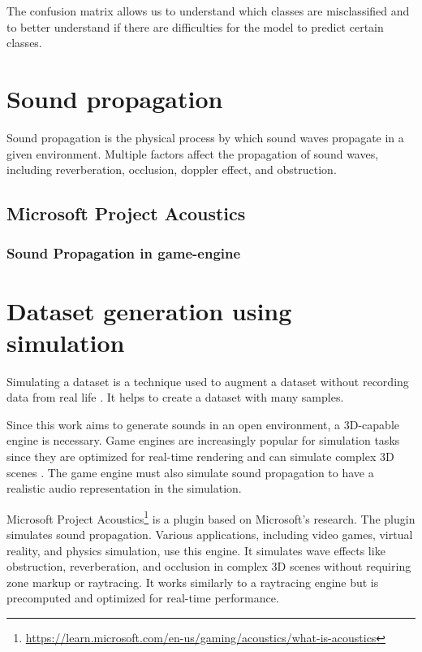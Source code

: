 The confusion matrix allows us to understand which classes are misclassified and to better understand if there are difficulties for the model to predict certain classes.


\section{Sound propagation}
Sound propagation is the physical process by which sound waves propagate in a given environment. Multiple factors affect the propagation of sound waves, including reverberation, occlusion, doppler effect, and obstruction.

\subsection{Microsoft Project Acoustics}


\subsubsection{Sound Propagation in game-engine}

\section{Dataset generation using simulation}
\label{sec:dataset_generation_simulation}

Simulating a dataset is a technique used to augment a dataset without recording data from real life \cite{ghilardi2019automatic}. It helps to create a dataset with many samples. 

Since this work aims to generate sounds in an open environment, a 3D-capable engine is necessary. Game engines are increasingly popular for simulation tasks since they are optimized for real-time rendering and can simulate complex 3D scenes \cite{carla}. The game engine must also simulate sound propagation to have a realistic audio representation in the simulation. 


Microsoft Project Acoustics\footnote{\url{https://learn.microsoft.com/en-us/gaming/acoustics/what-is-acoustics}} is a plugin based on Microsoft's research\cite{rosen2020interactive}. The plugin simulates sound propagation. Various applications, including video games, virtual reality, and physics simulation, use this engine. It simulates wave effects like obstruction, reverberation, and occlusion in complex 3D scenes without requiring zone markup or raytracing. It works similarly to a raytracing engine but is precomputed and optimized for real-time performance. 

